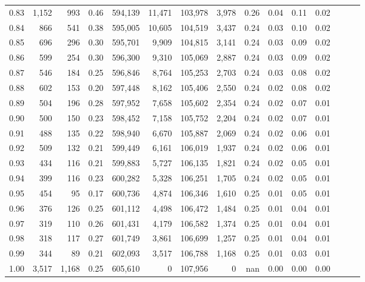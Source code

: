 \begin{tabular}{rrrrrrrrrrrrrrr}
0.83 &   1,152 &     993 &  0.46 &  594,139 &   11,471 &  103,978 &    3,978 &  0.26 &  0.04 &  0.11 &      0.02 \\
0.84 &     866 &     541 &  0.38 &  595,005 &   10,605 &  104,519 &    3,437 &  0.24 &  0.03 &  0.10 &      0.02 \\
0.85 &     696 &     296 &  0.30 &  595,701 &    9,909 &  104,815 &    3,141 &  0.24 &  0.03 &  0.09 &      0.02 \\
0.86 &     599 &     254 &  0.30 &  596,300 &    9,310 &  105,069 &    2,887 &  0.24 &  0.03 &  0.09 &      0.02 \\
0.87 &     546 &     184 &  0.25 &  596,846 &    8,764 &  105,253 &    2,703 &  0.24 &  0.03 &  0.08 &      0.02 \\
0.88 &     602 &     153 &  0.20 &  597,448 &    8,162 &  105,406 &    2,550 &  0.24 &  0.02 &  0.08 &      0.02 \\
0.89 &     504 &     196 &  0.28 &  597,952 &    7,658 &  105,602 &    2,354 &  0.24 &  0.02 &  0.07 &      0.01 \\
0.90 &     500 &     150 &  0.23 &  598,452 &    7,158 &  105,752 &    2,204 &  0.24 &  0.02 &  0.07 &      0.01 \\
0.91 &     488 &     135 &  0.22 &  598,940 &    6,670 &  105,887 &    2,069 &  0.24 &  0.02 &  0.06 &      0.01 \\
0.92 &     509 &     132 &  0.21 &  599,449 &    6,161 &  106,019 &    1,937 &  0.24 &  0.02 &  0.06 &      0.01 \\
0.93 &     434 &     116 &  0.21 &  599,883 &    5,727 &  106,135 &    1,821 &  0.24 &  0.02 &  0.05 &      0.01 \\
0.94 &     399 &     116 &  0.23 &  600,282 &    5,328 &  106,251 &    1,705 &  0.24 &  0.02 &  0.05 &      0.01 \\
0.95 &     454 &      95 &  0.17 &  600,736 &    4,874 &  106,346 &    1,610 &  0.25 &  0.01 &  0.05 &      0.01 \\
0.96 &     376 &     126 &  0.25 &  601,112 &    4,498 &  106,472 &    1,484 &  0.25 &  0.01 &  0.04 &      0.01 \\
0.97 &     319 &     110 &  0.26 &  601,431 &    4,179 &  106,582 &    1,374 &  0.25 &  0.01 &  0.04 &      0.01 \\
0.98 &     318 &     117 &  0.27 &  601,749 &    3,861 &  106,699 &    1,257 &  0.25 &  0.01 &  0.04 &      0.01 \\
0.99 &     344 &      89 &  0.21 &  602,093 &    3,517 &  106,788 &    1,168 &  0.25 &  0.01 &  0.03 &      0.01 \\
1.00 &   3,517 &   1,168 &  0.25 &  605,610 &        0 &  107,956 &        0 &   nan &  0.00 &  0.00 &      0.00 \\
\bottomrule
\end{tabular}
